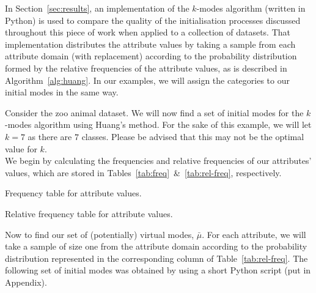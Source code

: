 In Section~\ref{sec:results}, an implementation of the \(k\)-modes algorithm 
(written in Python) is used to compare the quality of the initialisation 
processes discussed throughout this piece of work when applied to a collection 
of datasets. That implementation distributes the attribute values by taking a
sample from each attribute domain (with replacement) according to the 
probability distribution formed by the relative frequencies of the attribute
values, as is described in Algorithm~\ref{alg:huang}. In our examples, we will
assign the categories to our initial modes in the same way.\\

\begin{example}\label{ex:huang}
    Consider the zoo animal dataset. We will now find a set of initial modes for
    the \(k\)-modes algorithm using Huang's method. For the sake of this
    example, we will let \(k = 7\) as there are \(7\) classes. Please be advised
    that this may not be the optimal value for \(k\).\\
    
    We begin by calculating the frequencies and relative frequencies of our 
    attributes' values, which are stored in 
    Tables~\ref{tab:freq}~\&~\ref{tab:rel-freq}, respectively.\\

    \begin{table}[h]
    \resizebox{\textwidth}{!}{%
        
    }
    \caption{Frequency table for attribute values.}\label{tab:freq}
    \end{table}

    \begin{table}[h]
    \resizebox{\textwidth}{!}{%
        
    }
    \caption{Relative frequency table for attribute values.}\label{tab:rel-freq}
    \end{table}

    Now to find our set of (potentially) virtual modes, \(\bar{\mu}\). For each
    attribute, we will take a sample of size one from the attribute domain
    according to the probability distribution represented in the corresponding
    column of Table~\ref{tab:rel-freq}. The following set of initial modes was 
    obtained by using a short Python script (put in Appendix).\\


\end{example}
